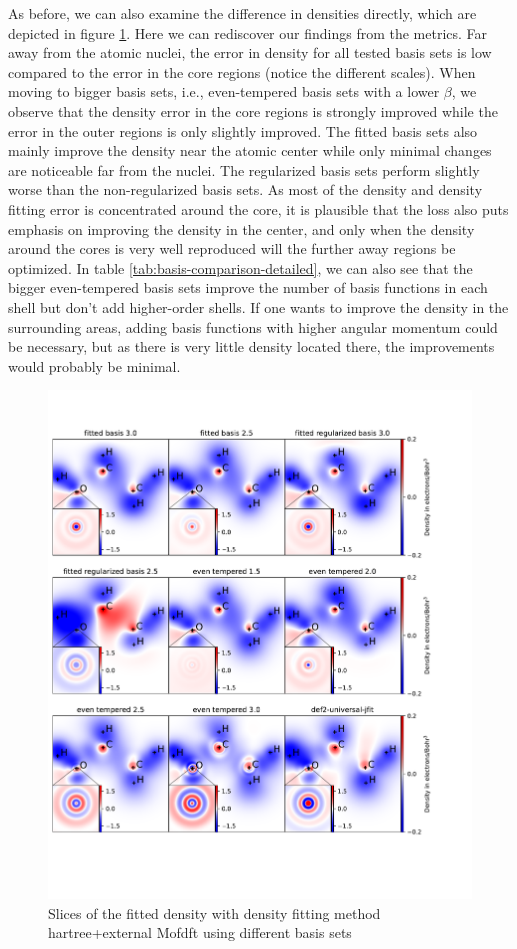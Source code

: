As before, we can also examine the difference in densities directly, which are depicted in figure \ref{fig:slices_basis_sets}. Here we can rediscover our findings from the metrics. Far away from the atomic nuclei, the error in density for all tested basis sets is low compared to the error in the core regions (notice the different scales). When moving to bigger basis sets, i.e., even-tempered basis sets with a lower $\beta$, we observe that the density error in the core regions is strongly improved while the error in the outer regions is only slightly improved. The fitted basis sets also mainly improve the density near the atomic center while only minimal changes are noticeable far from the nuclei. The regularized basis sets perform slightly worse than the non-regularized basis sets. As most of the density and density fitting error is concentrated around the core, it is plausible that the loss also puts emphasis on improving the density in the center, and only when the density around the cores is very well reproduced will the further away regions be optimized. In table \ref{tab:basis-comparison-detailed}, we can also see that the bigger even-tempered basis sets improve the number of basis functions in each shell but don't add higher-order shells. If one wants to improve the density in the surrounding areas, adding basis functions with higher angular momentum could be necessary, but as there is very little density located there, the improvements would probably be minimal.\\
 \begin{figure}
   \centering
   \includegraphics[width=1\textwidth]{chapters/results/results_images/basis_set_slices.pdf}
     \caption{Slices of the fitted density with density fitting method hartree+external Mofdft using different basis sets}
     \label{fig:slices_basis_sets}
 \end{figure}

